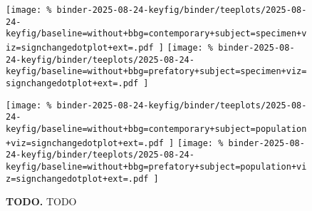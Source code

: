 \begin{figure*}


\texttt{[image: \%
binder-2025-08-24-keyfig/binder/teeplots/2025-08-24-keyfig/baseline=without+bbg=contemporary+subject=specimen+viz=signchangedotplot+ext=.pdf
]}%
\texttt{[image: \%
binder-2025-08-24-keyfig/binder/teeplots/2025-08-24-keyfig/baseline=without+bbg=prefatory+subject=specimen+viz=signchangedotplot+ext=.pdf
]}

\texttt{[image: \%
binder-2025-08-24-keyfig/binder/teeplots/2025-08-24-keyfig/baseline=without+bbg=contemporary+subject=population+viz=signchangedotplot+ext=.pdf
]}%
\texttt{[image: \%
binder-2025-08-24-keyfig/binder/teeplots/2025-08-24-keyfig/baseline=without+bbg=prefatory+subject=population+viz=signchangedotplot+ext=.pdf
]}

\vspace{-1ex}

\caption{
\textbf{TODO.}
TODO
}
\label{fig:sign-change}

\end{figure*}
